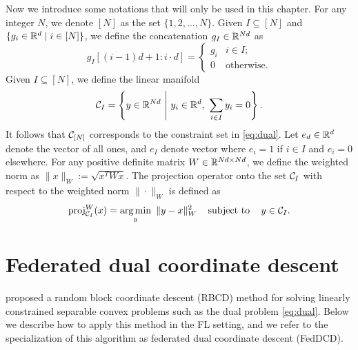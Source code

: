 Now we introduce some notations that will only be used in this chapter. For any integer $N$, we denote $[N]$ as the set $\{1,2,\ldots, N\}$. Given $I \subseteq [N]$ and $\{g_i \in \mathbb{R}^d \mid i \in [N]\}$, we define the concatenation $g_I \in \mathbb{R}^{Nd}$ as 
\[
    g_{I}[(i-1)d + 1 : i\cdot d] = 
    \begin{cases} 
      g_i & i \in I ;\\
      0 & \mbox{otherwise} .
    \end{cases}
\]
Given $I \subseteq [N]$, we define the linear manifold 
\[
    \mathcal{C}_I= \left\{y \in\mathbb{R}^{Nd} ~\Bigg|~ y_i\in\mathbb{R}^d, ~\sum_{i\in I}y_i = 0\right\}.
\]
It follows that $\mathcal{C}_{[N]}$ corresponds to the constraint set in \autoref{eq:dual}. Let $e_d \in \mathbb{R}^d$ denote the vector of all ones, and $e_I$ denote vector where $e_i = 1$ if $i \in I$ and $e_i = 0$ elsewhere.  For any positive definite matrix $W\in\mathbb{R}^{Nd\times Nd}$, we define the weighted norm as $\|x\|_W := \sqrt{x^TWx}$. The projection operator onto the set $\mathcal{C}_I$ with respect to the weighted norm $\|\cdot\|_W$ is defined as
\[
    \operatorname{proj}_{\mathcal{C}_I}^{W}(x) = \underset{y}{\textrm{arg}\,{\min}}\enskip \|y-x\|_W^2 \enspace\enspace\mathop{\hbox{\rm subject to}}\enspace\enspace y \in \mathcal{C}_I.
\]


\section{Federated dual coordinate descent}
\label{sec:FedDCD}

\citet{necoara2017random} proposed a random block coordinate descent (RBCD) method for solving linearly constrained separable convex problems such as the dual problem \eqref{eq:dual}. Below we describe how to apply this method in the FL setting, and we refer to the specialization of this algorithm as federated dual coordinate descent (FedDCD).

